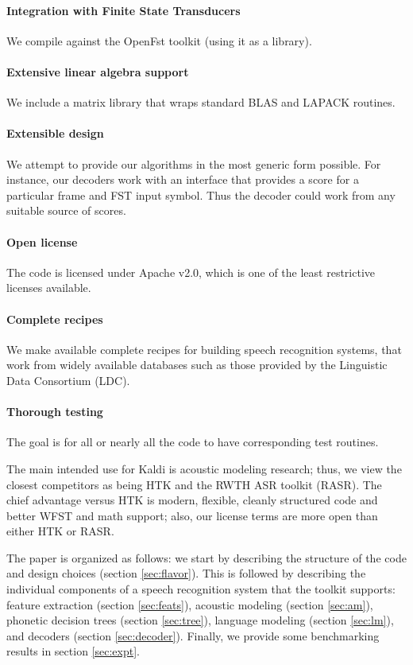 \documentclass[10pt,conference,letterpaper]{IEEEtran}
\begin{document}
\paragraph*{Integration with Finite State Transducers} We compile against the 
OpenFst toolkit \cite{openfst} (using it as a library).
\paragraph*{Extensive linear algebra support} We include a matrix library that wraps 
standard BLAS and LAPACK routines.
\paragraph*{Extensible design} We attempt to provide our algorithms in the most 
generic form possible. For instance, our decoders work with an interface that 
provides a score for a particular frame and FST input symbol. Thus the decoder 
could work from any suitable source of scores.
\paragraph*{Open license} The code is licensed under Apache v2.0, which is one 
of the least restrictive licenses available.
\paragraph*{Complete recipes} We make available complete recipes for 
building speech recognition systems, that work from widely available databases 
such as those provided by the Linguistic Data Consortium (LDC).
\paragraph*{Thorough testing}
The goal is for all or nearly all the code to have corresponding test routines.

The main intended use for Kaldi is acoustic modeling research; thus, we view
the closest competitors as being HTK and the RWTH ASR toolkit (RASR).  The chief
advantage versus HTK is modern, flexible, cleanly structured code and better
WFST and math support; also, our license terms are more open than either HTK
or RASR.

The paper is organized as follows: we start by describing the structure of the 
code and design choices (section \ref{sec:flavor}). This is followed by 
describing the individual components of a speech recognition system that the 
toolkit supports: feature extraction (section \ref{sec:feats}), acoustic 
modeling (section \ref{sec:am}), phonetic decision trees (section 
\ref{sec:tree}), language modeling (section \ref{sec:lm}), and decoders 
(section \ref{sec:decoder}). Finally, we provide some benchmarking results in 
section \ref{sec:expt}.
\end{document}
